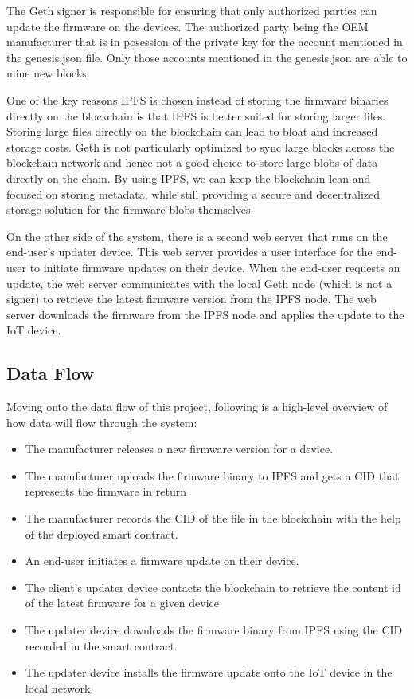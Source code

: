 \documentclass{article}
\begin{document}
The Geth signer is responsible for ensuring that only authorized parties can update the firmware on the devices. The authorized party being the OEM manufacturer that is in posession of the private key for the account mentioned in the genesis.json file. Only those accounts mentioned in the genesis.json are able to mine new blocks. 

One of the key reasons IPFS is chosen instead of storing the firmware binaries directly on the blockchain is that IPFS is better suited for storing larger files. Storing large files directly on the blockchain can lead to bloat and increased storage costs. Geth is not particularly optimized to sync large blocks across the blockchain network and hence not a good choice to store large blobs of data directly on the chain. By using IPFS, we can keep the blockchain lean and focused on storing metadata, while still providing a secure and decentralized storage solution for the firmware blobs themselves.

On the other side of the system, there is a second web server that runs on the end-user's updater device. This web server provides a user interface for the end-user to initiate firmware updates on their device. When the end-user requests an update, the web server communicates with the local Geth node (which is not a signer) to retrieve the latest firmware version from the IPFS node. The web server downloads the firmware from the IPFS node and applies the update to the IoT device.

\subsection{Data Flow}
Moving onto the data flow of this project, following is a high-level overview of how data will flow through the system:
\begin{itemize}
    \item The manufacturer releases a new firmware version for a device.
    \item The manufacturer uploads the firmware binary to IPFS and gets a CID that represents the firmware in return
    \item The manufacturer records the CID of the file in the blockchain with the help of the deployed smart contract.
    \item An end-user initiates a firmware update on their device.
    \item The client's updater device contacts the blockchain to retrieve the content id of the latest firmware for a given device
    \item The updater device downloads the firmware binary from IPFS using the CID recorded in the smart contract.
    \item The updater device installs the firmware update onto the IoT device in the local network.
\end{itemize}
\end{document}
